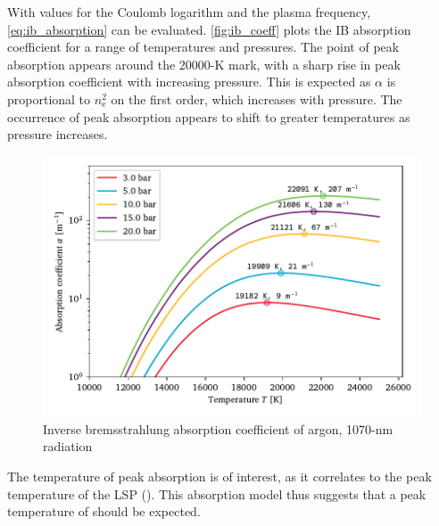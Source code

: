         With values for the Coulomb logarithm and the plasma frequency, \autoref{eq:ib_absorption} can be evaluated. \autoref{fig:ib_coeff} plots the IB absorption coefficient for a range of temperatures and pressures. The point of peak absorption appears around the \num{20000}-\unit{K} mark, with a sharp rise in peak absorption coefficient with increasing pressure. This is expected as $\alpha$ is proportional to $n_\mathrm{e}^2$ on the first order, which increases with pressure. The occurrence of peak absorption appears to shift to greater temperatures as pressure increases.

        \begin{figure}[h]
            \centering
            \includegraphics[]{assets/4 models/absorption}
            \caption{Inverse bremsstrahlung absorption coefficient of argon, \num{1070}-\unit{nm} radiation}
            \label{fig:ib_coeff}
        \end{figure}

        The temperature of peak absorption is of interest, as it correlates to the peak temperature of the LSP (\textcite{keeferLaserSustainedPlasmas1989}). This absorption model thus suggests that a peak temperature of  should be expected. 
    
